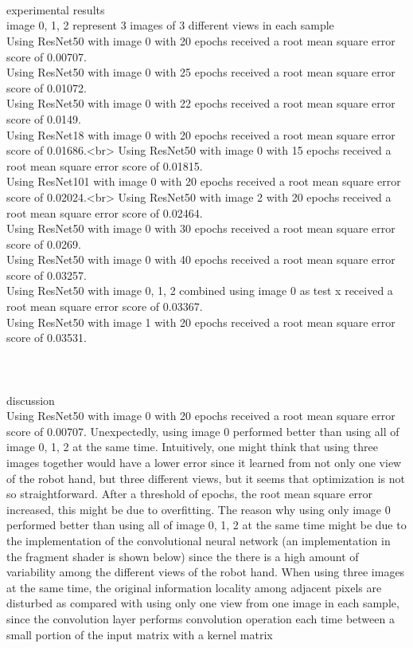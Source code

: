 \documentclass[12pt, border = 4pt, multi]{article} %
\begin{document}
\leavevmode
\noindent
\\
\\
\\
experimental results\\
image 0, 1, 2 represent 3 images of 3 different views in each sample\\
Using ResNet50 with image 0 with 20 epochs received a root mean square error score of 0.00707.\\
Using ResNet50 with image 0 with 25 epochs received a root mean square error score of 0.01072.\\
Using ResNet50 with image 0 with 22 epochs received a root mean square error score of 0.0149.\\
Using ResNet18 with image 0 with 20 epochs received a root mean square error score of 0.01686.<br>
Using ResNet50 with image 0 with 15 epochs received a root mean square error score of 0.01815.\\
Using ResNet101 with image 0 with 20 epochs received a root mean square error score of 0.02024.<br>
Using ResNet50 with image 2 with 20 epochs received a root mean square error score of 0.02464.\\
Using ResNet50 with image 0 with 30 epochs received a root mean square error score of 0.0269.\\
Using ResNet50 with image 0 with 40 epochs received a root mean square error score of 0.03257.\\
Using ResNet50 with image 0, 1, 2 combined using image 0 as test x received a root mean square error score of 0.03367.\\
Using ResNet50 with image 1 with 20 epochs received a root mean square error score of 0.03531.\\
\\
\\
\\
discussion\\
Using ResNet50 with image 0 with 20 epochs received a root mean square error score of 0.00707. Unexpectedly, using image 0 performed better than using all of image 0, 1, 2 at the same time. Intuitively, one might think that using three images together would have a lower error since it learned from not only one view of the robot hand, but three different views, but it seems that optimization is not so straightforward. After a threshold of epochs, the root mean square error increased, this might be due to overfitting. The reason why using only image 0 performed better than using all of image 0, 1, 2 at the same time might be due to the implementation of the convolutional neural network (an implementation in the fragment shader is shown below) since the there is a high amount of variability among the different views of the robot hand. When using three images at the same time, the original information locality among adjacent pixels are disturbed as compared with using only one view from one image in each sample, since the convolution layer performs convolution operation each time between a small portion of the input matrix with a kernel matrix
\end{document}
